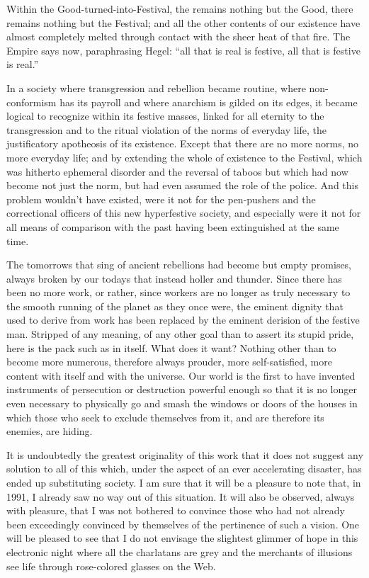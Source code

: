 Within the Good-turned-into-Festival, the remains nothing but the Good, there remains nothing but the Festival; and all the other contents of our existence have almost completely melted through contact with the sheer heat of that fire. The Empire says now, paraphrasing Hegel: ``all that is real is festive, all that is festive is real.''

In a society where transgression and rebellion became routine, where non-conformism has its payroll and where anarchism is gilded on its edges, it became logical to recognize within its festive masses, linked for all eternity to the transgression and to the ritual violation of the norms of everyday life, the justificatory apotheosis of its existence. Except that there are no more norms, no more everyday life; and by extending the whole of existence to the Festival, which was hitherto ephemeral disorder and the reversal of taboos but which had now become not just the norm, but had even assumed the role of the police. And this problem wouldn't have existed, were it not for the pen-pushers and the correctional officers of this new hyperfestive society, and especially were it not for all means of comparison with the past having been extinguished at the same time.

The tomorrows that sing of ancient rebellions had become but empty promises, always broken by our todays that instead holler and thunder. Since there has been no more work, or rather, since workers are no longer as truly necessary to the smooth running of the planet as they once were, the eminent dignity that used to derive from work has been replaced by the eminent derision of the festive man. Stripped of any meaning, of any other goal than to assert its stupid pride, here is the pack such as in itself. What does it want? Nothing other than to become more numerous, therefore always prouder, more self-satisfied, more content with itself and with the universe. Our world is the first to have invented instruments of persecution or destruction powerful enough so that it is no longer even necessary to physically go and smash the windows or doors of the houses in which those who seek to exclude themselves from it, and are therefore its enemies, are hiding.

It is undoubtedly the greatest originality of this work that it does not suggest any solution to all of this which, under the aspect of an ever accelerating disaster, has ended up substituting society. I am sure that it will be a pleasure to note that, in 1991, I already saw no way out of this situation. It will also be observed, always with pleasure, that I was not bothered to convince those who had not already been exceedingly convinced by themselves of the pertinence of such a vision. One will be pleased to see that I do not envisage the slightest glimmer of hope in this electronic night where all the charlatans are grey and the merchants of illusions see life through rose-colored glasses on the Web.

